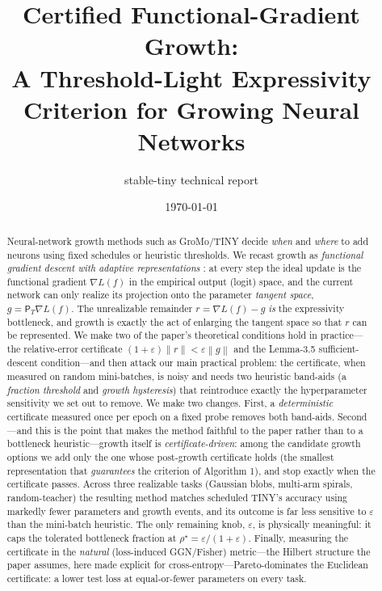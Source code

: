 \documentclass{article}
\title{\textbf{Certified Functional-Gradient Growth:\\
A Threshold-Light Expressivity Criterion for Growing Neural Networks}}
\author{stable-tiny technical report}
\date{\today}
\newcommand{\norm}[1]{\left\lVert #1 \right\rVert}
\newcommand{\grad}{\nabla}
\newcommand{\PT}{\mathsf{P}_{T}}
\newcommand{\eps}{\varepsilon}
\begin{document}
\maketitle

\begin{abstract}
Neural-network growth methods such as GroMo/TINY decide \emph{when} and \emph{where}
to add neurons using fixed schedules or heuristic thresholds. We recast growth as
\emph{functional gradient descent with adaptive representations}
\citep{fgd2025}: at every step the ideal update is the functional gradient
$\grad L(f)$ in the empirical output (logit) space, and the current network can
only realize its projection onto the parameter \emph{tangent space},
$g=\PT\grad L(f)$. The unrealizable remainder $r=\grad L(f)-g$ \emph{is} the
expressivity bottleneck, and growth is exactly the act of enlarging the tangent
space so that $r$ can be represented. We make two of the paper's theoretical
conditions hold in practice---the relative-error certificate
$(1+\eps)\norm{r}<\eps\norm{g}$ and the Lemma-3.5 sufficient-descent
condition---and then attack our main practical problem: the certificate, when
measured on random mini-batches, is noisy and needs two heuristic band-aids (a
\emph{fraction threshold} and \emph{growth hysteresis}) that reintroduce exactly
the hyperparameter sensitivity we set out to remove. We make two changes. First,
a \emph{deterministic} certificate measured once per epoch on a fixed probe
removes both band-aids. Second---and this is the point that makes the method
faithful to the paper rather than to a bottleneck heuristic---growth itself is
\emph{certificate-driven}: among the candidate growth options we add only the one
whose post-growth certificate holds (the smallest representation that
\emph{guarantees} the criterion of Algorithm 1), and stop exactly when the
certificate passes. Across three realizable tasks (Gaussian blobs, multi-arm
spirals, random-teacher) the resulting method matches scheduled TINY's accuracy
using markedly fewer parameters and growth events, and its outcome is far less
sensitive to $\eps$ than the mini-batch heuristic. The only remaining knob,
$\eps$, is physically meaningful: it caps the tolerated bottleneck fraction at
$\rho^\star=\eps/(1+\eps)$. Finally, measuring the certificate in the
\emph{natural} (loss-induced GGN/Fisher) metric---the Hilbert structure the paper
assumes, here made explicit for cross-entropy---Pareto-dominates the Euclidean
certificate: a lower test loss at equal-or-fewer parameters on every task.
\end{abstract}
\end{document}
